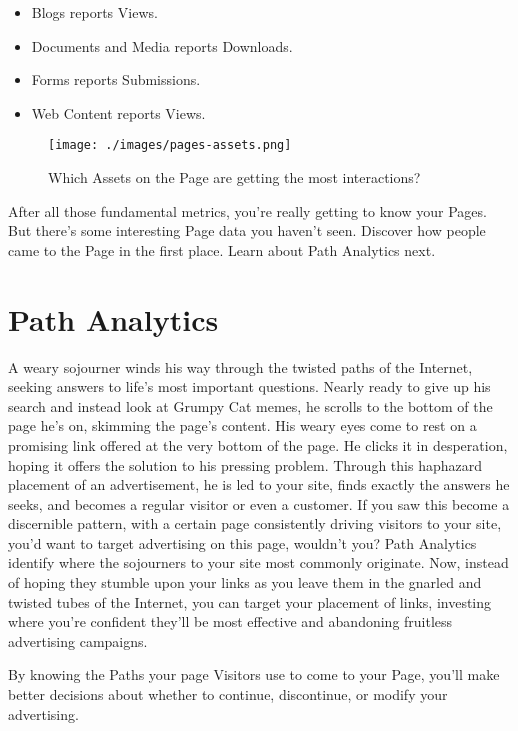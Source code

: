 \begin{itemize}
\tightlist
\item
  Blogs reports Views.
\item
  Documents and Media reports Downloads.
\item
  Forms reports Submissions.
\item
  Web Content reports Views.
\end{itemize}

\begin{figure}
\centering
\texttt{[image: ./images/pages-assets.png]}
\caption{Which Assets on the Page are getting the most interactions?}
\end{figure}

After all those fundamental metrics, you're really getting to know your
Pages. But there's some interesting Page data you haven't seen. Discover
how people came to the Page in the first place. Learn about Path
Analytics next.

\section{Path Analytics}\label{path-analytics-1}

A weary sojourner winds his way through the twisted paths of the
Internet, seeking answers to life's most important questions. Nearly
ready to give up his search and instead look at Grumpy Cat memes, he
scrolls to the bottom of the page he's on, skimming the page's content.
His weary eyes come to rest on a promising link offered at the very
bottom of the page. He clicks it in desperation, hoping it offers the
solution to his pressing problem. Through this haphazard placement of an
advertisement, he is led to your site, finds exactly the answers he
seeks, and becomes a regular visitor or even a customer. If you saw this
become a discernible pattern, with a certain page consistently driving
visitors to your site, you'd want to target advertising on this page,
wouldn't you? Path Analytics identify where the sojourners to your site
most commonly originate. Now, instead of hoping they stumble upon your
links as you leave them in the gnarled and twisted tubes of the
Internet, you can target your placement of links, investing where you're
confident they'll be most effective and abandoning fruitless advertising
campaigns.

By knowing the Paths your page Visitors use to come to your Page, you'll
make better decisions about whether to continue, discontinue, or modify
your advertising.

